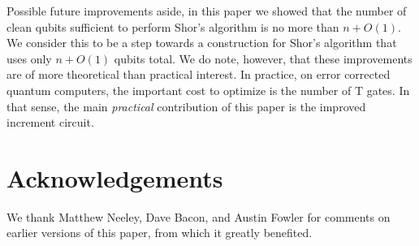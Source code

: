 \documentclass[twocolumn,longbibliography]{quantumarticle-customized}
\begin{document}
Possible future improvements aside, in this paper we showed that the number of clean qubits sufficient to perform Shor's algorithm is no more than $n + O(1)$.
We consider this to be a step towards a construction for Shor's algorithm that uses only $n + O(1)$ qubits total.
We do note, however, that these improvements are of more theoretical than practical interest.
In practice, on error corrected quantum computers, the important cost to optimize is the number of T gates.
In that sense, the main {\em practical} contribution of this paper is the improved increment circuit.


\section{Acknowledgements}

We thank Matthew Neeley, Dave Bacon, and Austin Fowler for comments on earlier versions of this paper, from which it greatly benefited.




\end{document}
